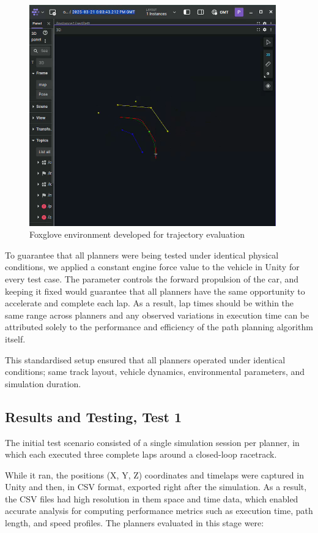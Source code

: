 \documentclass[a4paper,11pt]{report}
\begin{document}
\begin{figure}[H]
    \centering
    \includegraphics[width=0.95\textwidth]{Images/foxglove.png}
    \caption{Foxglove environment developed for trajectory evaluation}
    \label{fig:foxglove}
\end{figure}

To guarantee that all planners were being tested under identical physical conditions,
we applied a constant engine force value to the vehicle in Unity for every test case.
The parameter controls the forward propulsion of the car, and keeping it fixed would
guarantee that all planners have the same opportunity to accelerate and complete each lap.
As a result,
lap times should be within the same range across planners and any observed variations in 
execution time can be attributed solely to the performance and efficiency of the path planning algorithm itself.

This standardised setup ensured that all planners operated under identical conditions; 
same track layout, vehicle dynamics, environmental parameters, and simulation duration.

\subsection{Results and Testing, Test 1}
The initial test scenario consisted of a single simulation session per planner, 
in which each executed three complete laps around a closed-loop racetrack. 

While it ran,
the positions (X, Y, Z) coordinates and timelaps were captured in Unity and then, in CSV format, exported right after the simulation.
As a result, the CSV files had high resolution in them
space and time data, which enabled accurate analysis for computing performance metrics 
such as execution time, path length, and speed profiles.
The planners evaluated in this stage were:
\end{document}
